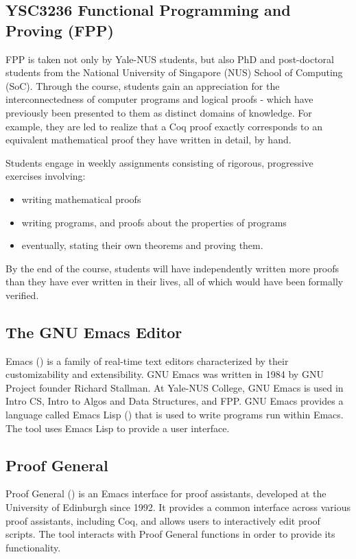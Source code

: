 \subsection{YSC3236 Functional Programming and Proving (FPP)}
FPP is taken not only by Yale-NUS students, but also PhD and post-doctoral students from the National University of Singapore (NUS) School of Computing (SoC). Through the course, students gain an appreciation for the interconnectedness of computer programs and logical proofs - which have previously been presented to them as distinct domains of knowledge. For example, they are led to realize that a Coq proof exactly corresponds to an equivalent mathematical proof they have written in detail, by hand.

Students engage in weekly assignments consisting of rigorous, progressive exercises involving:

\begin{itemize}
    \item writing mathematical proofs
    \item writing programs, and proofs about the properties of programs
    \item eventually, stating their own theorems and proving them.
\end{itemize}

By the end of the course, students will have independently written more proofs than they have ever written in their lives, all of which would have been formally verified.

\subsection{The GNU Emacs Editor}
Emacs (\cite{emacs-homepage}) is a family of real-time text editors characterized by their customizability and extensibility. GNU Emacs was written in 1984 by GNU Project founder Richard Stallman. At Yale-NUS College, GNU Emacs is used in Intro CS, Intro to Algos and Data Structures, and FPP. GNU Emacs provides a language called Emacs Lisp (\cite{emacs-lisp-homepage}) that is used to write programs run within Emacs. The  tool uses Emacs Lisp to provide a user interface.

\subsection{Proof General}
Proof General (\cite{pg-homepage}) is an Emacs interface for proof assistants, developed at the University of Edinburgh since 1992. It provides a common interface across various proof assistants, including Coq, and allows users to interactively edit proof scripts. The  tool interacts with Proof General functions in order to provide its functionality.